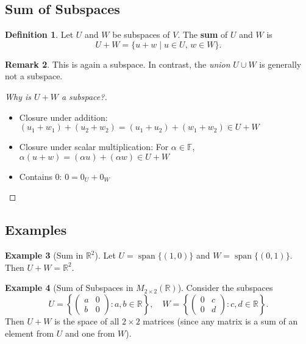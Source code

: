 \documentclass[11pt]{article}
\theoremstyle{definition}
\newtheorem{definition}{Definition}[section]
\newtheorem{example}[definition]{Example}
\newtheorem{remark}[definition]{Remark}
\theoremstyle{plain}
\begin{document}
\subsection{Sum of Subspaces}

\begin{definition}
Let $U$ and $W$ be subspaces of $V$. The \textbf{sum} of $U$ and $W$ is
\[
U + W = \{ u + w \mid u \in U,\, w \in W \}.
\]
\end{definition}

\begin{remark}
This is again a subspace. In contrast, the \emph{union} $U \cup W$ is generally not a subspace.
\end{remark}

\begin{proof}[Why is $U + W$ a subspace?]
\begin{itemize}
    \item Closure under addition: $(u_1 + w_1) + (u_2 + w_2) = (u_1 + u_2) + (w_1 + w_2) \in U + W$
    \item Closure under scalar multiplication: For $\alpha \in \mathbb{F}$, $\alpha(u + w) = (\alpha u) + (\alpha w) \in U + W$
    \item Contains $0$: $0 = 0_U + 0_W$
\end{itemize}
\end{proof}

\subsection{Examples}

\begin{example}[Sum in $\mathbb{R}^2$]
Let $U = \operatorname{span}\{ (1,0) \} $ and $W = \operatorname{span}\{ (0,1) \} $. Then $U + W = \mathbb{R}^2$.
\end{example}

\begin{example}[Sum of Subspaces in $M_{2\times 2}(\mathbb{R})$]
Consider the subspaces
\[
U = \left\{ \begin{pmatrix} a & 0 \\ b & 0 \end{pmatrix} : a,b \in \mathbb{R} \right\}, \quad
W = \left\{ \begin{pmatrix} 0 & c \\ 0 & d \end{pmatrix} : c,d \in \mathbb{R} \right\}.
\]
Then $U + W$ is the space of all $2 \times 2$ matrices (since any matrix is a sum of an element from $U$ and one from $W$).
\end{example}
\end{document}
